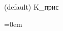 \Huge
\huge
\LARGE
\Large
\large
\normalsize (default)
\small
\footnotesize
\scriptsize
\tiny
\textup{K_\textup{прис}}
\begin{enumerate}
\itemsep=0em
\setcounter{enumi}{9}
\end{enumerate}
